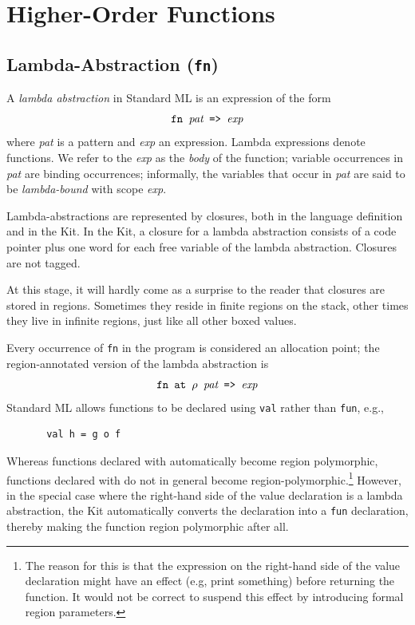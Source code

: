 \documentclass[12pt]{book}
\begin{document}
\chapter{Higher-Order Functions}
\label{hof.sec}
%
\section{Lambda-Abstraction ({\tt fn})}
A {\em lambda abstraction} in Standard ML is an expression of the
form 
$$\hbox{\tt fn {\it pat} => {\it exp}}$$
where {\it pat} is a pattern and {\it exp} an expression.
Lambda expressions denote functions. We refer to the {\it exp} as the
{\em body} of the function; variable occurrences in {\it pat} are
binding occurrences; informally, the variables that occur
in {\it pat} are said to be {\em lambda-bound} with scope {\it exp}. 

Lambda-abstractions are represented by closures, both in the language
definition and in the Kit. In the Kit, a closure for a lambda abstraction
consists of a code pointer plus one word for each free variable of the
lambda abstraction. Closures are not tagged. 

At this stage, it will hardly come as a surprise to the reader that closures are stored
in regions.  Sometimes they reside in finite regions on the stack, other times
they live in infinite regions, just like all other boxed values.

Every occurrence of {\tt fn} in the program is considered 
an allocation point; the region-annotated version of the lambda abstraction is
$$\hbox{\tt fn at $\rho$ {\it pat} => {\it exp}}$$
Standard ML allows  functions to be declared using {\tt val} rather than {\tt fun}, e.g., 
\begin{verbatim}
       val h = g o f
\end{verbatim}
Whereas functions declared with  automatically become region polymorphic,
functions declared with  do not in general become 
region-polymorphic.\footnote{The reason for this
is that the expression on the right-hand side of the value declaration might have an effect (e.g, 
print something) before returning the function. It would not be correct to suspend this effect by
introducing formal region parameters.} However, in the special case where the right-hand side of
the value declaration is a lambda abstraction, the Kit automatically converts the declaration
into a {\tt fun} declaration, thereby making the function region polymorphic after all.
\end{document}
